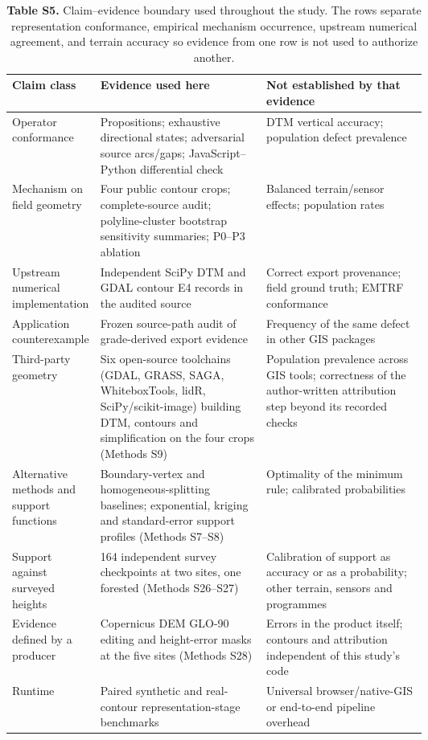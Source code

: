 \documentclass[11pt]{article}
\begin{document}
\begin{table}[!htbp]
\centering
\caption*{\textbf{Table S5.} Claim--evidence boundary used throughout the study. The rows separate representation conformance, empirical mechanism occurrence, upstream numerical agreement, and terrain accuracy so evidence from one row is not used to authorize another.}
\vspace{2mm}
\small
\scriptsize
\setlength{\tabcolsep}{3.2pt}
\begin{tabularx}{\linewidth}{@{}p{0.20\linewidth}p{0.40\linewidth}X@{}}
\toprule
Claim class & Evidence used here & Not established by that evidence \\
\midrule
Operator conformance & Propositions; exhaustive directional states; adversarial source arcs/gaps; JavaScript--Python differential check & DTM vertical accuracy; population defect prevalence \\
Mechanism on field geometry & Four public contour crops; complete-source audit; polyline-cluster bootstrap sensitivity summaries; P0--P3 ablation & Balanced terrain/sensor effects; population rates \\
Upstream numerical implementation & Independent SciPy DTM and GDAL contour E4 records in the audited source & Correct export provenance; field ground truth; EMTRF conformance \\
Application counterexample & Frozen source-path audit of grade-derived export evidence & Frequency of the same defect in other GIS packages \\
Third-party geometry & Six open-source toolchains (GDAL, GRASS, SAGA, WhiteboxTools, lidR, SciPy/scikit-image) building DTM, contours and simplification on the four crops (Methods S9) & Population prevalence across GIS tools; correctness of the author-written attribution step beyond its recorded checks \\
Alternative methods and support functions & Boundary-vertex and homogeneous-splitting baselines; exponential, kriging and standard-error support profiles (Methods S7--S8) & Optimality of the minimum rule; calibrated probabilities \\
Support against surveyed heights & 164 independent survey checkpoints at two sites, one forested (Methods S26--S27) & Calibration of support as accuracy or as a probability; other terrain, sensors and programmes \\
Evidence defined by a producer & Copernicus DEM GLO-90 editing and height-error masks at the five sites (Methods S28) & Errors in the product itself; contours and attribution independent of this study's code \\
Runtime & Paired synthetic and real-contour representation-stage benchmarks & Universal browser/native-GIS or end-to-end pipeline overhead \\
\bottomrule
\end{tabularx}
\end{table}
\end{document}
